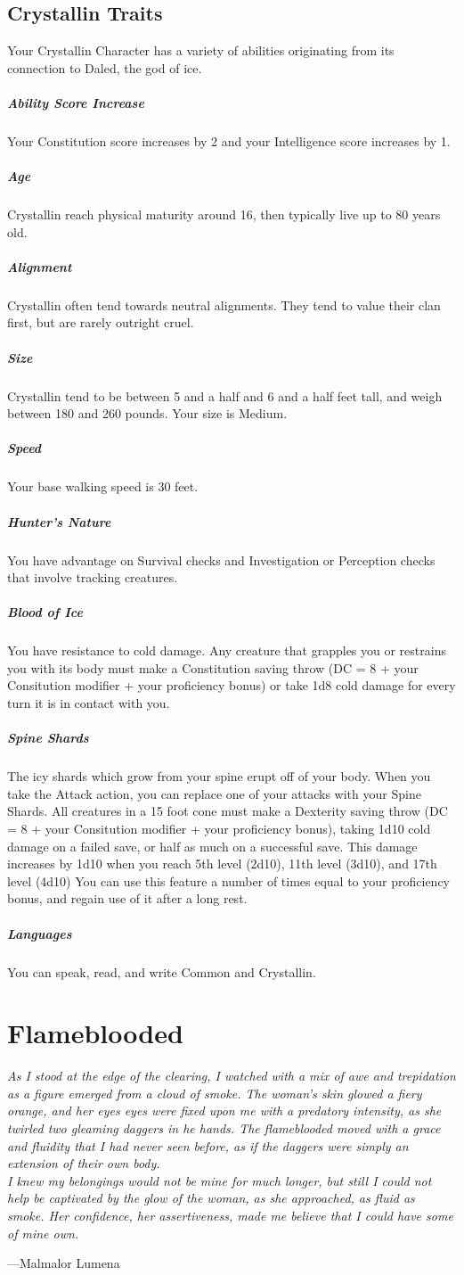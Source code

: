 \subsection{Crystallin Traits}
Your Crystallin Character has a variety of abilities originating from its connection to Daled, the god of ice.
\subparagraph{Ability Score Increase}Your Constitution score increases by 2 and your Intelligence score increases by 1.
\subparagraph{Age}Crystallin reach physical maturity around 16, then typically live up to 80 years old.
\subparagraph{Alignment}Crystallin often tend towards neutral alignments. They tend to value their clan first, but are rarely outright cruel.
\subparagraph{Size}Crystallin tend to be between 5 and a half and 6 and a half feet tall, and weigh between 180 and 260 pounds. Your size is Medium.
\subparagraph{Speed}Your base walking speed is 30 feet.
\subparagraph{Hunter's Nature} You have advantage on Survival checks and Investigation or Perception checks that involve tracking creatures.
\subparagraph{Blood of Ice} You have resistance to cold damage. Any creature that grapples you or restrains you with its body must make a Constitution saving throw (DC = 8 + your Consitution modifier + your proficiency bonus) or take 1d8 cold damage for every turn it is in contact with you. 
\subparagraph{Spine Shards} The icy shards which grow from your spine erupt off of your body. When you take the Attack action, you can replace one of your attacks with your Spine Shards. All creatures in a 15 foot cone must make a Dexterity saving throw (DC = 8 + your Consitution modifier + your proficiency bonus), taking 1d10 cold damage on a failed save, or half as much on a successful save. This damage increases by 1d10 when you reach 5th level (2d10), 11th level (3d10), and 17th level (4d10) You can use this feature a number of times equal to your proficiency bonus, and regain use of it after a long rest.
\subparagraph{Languages}You can speak, read, and write Common and Crystallin.

\raggedbottom
\pagebreak

\section{Flameblooded}
\textit{As I stood at the edge of the clearing, I watched with a mix of awe and trepidation as a figure emerged from a cloud of smoke. The woman's skin glowed a fiery orange, and her eyes eyes were fixed upon me with a predatory intensity, as she twirled two gleaming daggers in he hands. The flameblooded moved with a grace and fluidity that I had never seen before, as if the daggers were simply an extension of their own body.\\
I knew my belongings would not be mine for much longer, but still I could not help be captivated by the glow of the woman, as she approached, as fluid as smoke. Her confidence, her assertiveness, made me believe that I could have some of mine own.} \\ \begin{flushright}---Malmalor Lumena \end{flushright}
